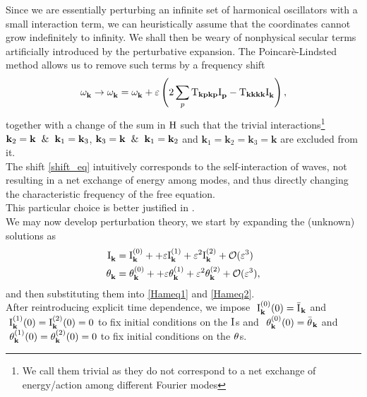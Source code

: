 Since we are essentially perturbing an infinite set of harmonical oscillators with a small interaction term, we can heuristically assume that
the coordinates cannot grow indefinitely to infinity. We shall then be weary of nonphysical secular terms artificially introduced by the perturbative
expansion. The Poincarè-Lindsted method allows us to remove such terms by a frequency shift
\begin{equation}
    \omega^{}_{\mathbf{k}} \rightarrow \omega^{}_{\mathbf{k}} = \omega^{}_{\mathbf{k}} + \varepsilon \left(2\sum_p \mathrm{T}_{\mathbf{kpkp}}\mathrm{I}^{}_\mathbf{p} - 
    \mathrm{T}_{\mathbf{kkkk}}\mathrm{I}^{}_\mathbf{k} \right),
    \label{shift_eq}
\end{equation}   
together with a change of the sum in $\mathrm{H}$ such that the trivial interactions\footnote{
    We call them trivial as they do not correspond to a net exchange of energy/action among different Fourier modes
} $\mathbf{k}_2=\mathbf{k} \hspace{2mm}\&\hspace{2mm} \mathbf{k}_1 = \mathbf{k}_3$, $\mathbf{k}_3=\mathbf{k} \hspace{2mm}\& \hspace{2mm}\mathbf{k}_1=\mathbf{k}_2$ and $\mathbf{k}_1=\mathbf{k}_2=\mathbf{k}_3=\mathbf{k}$ are excluded from it. \\
The shift \eqref{shift_eq} intuitively corresponds to the self-interaction of waves, not resulting in a net exchange of energy among modes, and thus directly changing 
the characteristic frequency of the free equation. \\ 
This particular choice is better justified in \cite{Nazarenko2011}. \\

We may now develop perturbation theory, we start by expanding the (unknown) solutions as
\begin{align}
    \mathrm{I}^{}_\mathbf{k} &= \mathrm{I}^{(0)}_\mathbf{k} +  + \varepsilon \mathrm{I}^{(1)}_\mathbf{k} + \varepsilon^2 \mathrm{I}^{(2)}_\mathbf{k} + \mathcal{O}(\varepsilon^3) \\
    \theta^{}_\mathbf{k} &= \theta^{(0)}_\mathbf{k} +  + \varepsilon \theta^{(1)}_\mathbf{k} + \varepsilon^2 \theta^{(2)}_\mathbf{k} + \mathcal{O}(\varepsilon^3),
\end{align}
and then substituting them into \eqref{Hameq1} and \eqref{Hameq2}. \\
After reintroducing explicit time dependence, we impose \(\ \mathrm{I}^{(0)}_\mathbf{k}(0) = \bar{\mathrm{I}^{}}_\mathbf{k}\) and \(\ \mathrm{I}^{(1)}_\mathbf{k}(0) = \mathrm{I}^{(2)}_\mathbf{k}(0) = 0\) to fix initial conditions on the $\mathrm{I}^{}$s and 
$\ \thaz_\mathbf{k}(0) = \bar{\tha}_\mathbf{k}$ and $\ \theta^{(1)}_\mathbf{k}(0) = \theta^{(2)}_\mathbf{k}(0) = 0$ to fix initial conditions on the $\theta^{}$s.\\

